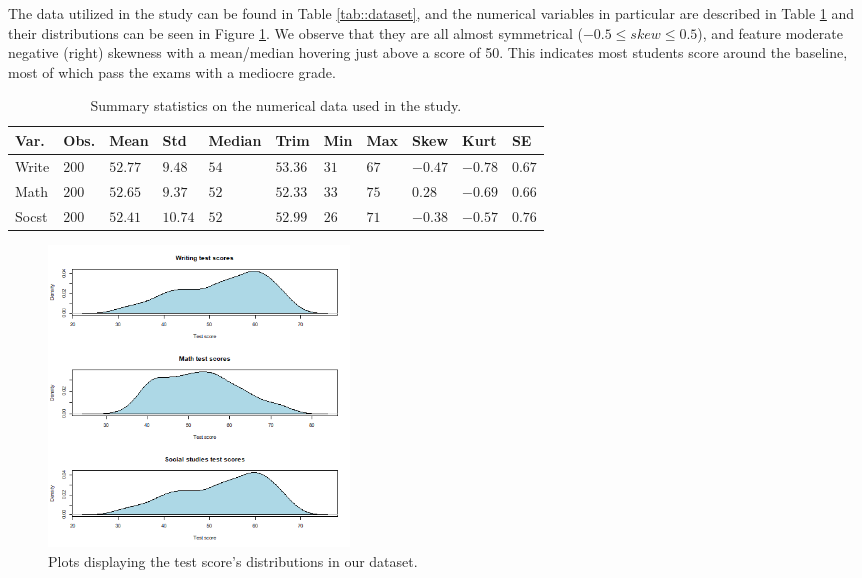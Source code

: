 \documentclass[10pt, a4paper]{article}
\begin{document}
	The data utilized in the study can be found in Table \ref{tab::dataset}, and the numerical variables in particular are described in Table \ref{tab::summary_stats} and their distributions can be seen in Figure \ref{fig::test_distribution}. We observe that they are all almost symmetrical ($-0.5 \leq skew \leq 0.5$), and feature moderate negative (right) skewness with a mean/median hovering just above a score of 50. This indicates most students score around the baseline, most of which pass the exams with a mediocre grade.
	
	\begin{table}
		\centering
		\begin{tabular}
			{ |p{1cm} p{0.5cm} p{0.7cm} p{0.7cm} p{1cm} p{0.7cm} p{0.5cm} p{0.5cm} p{0.5cm} p{0.5cm} p{0.5cm}| }
			\hline
			\textbf{Var.} & \textbf{Obs.} & \textbf{Mean} & \textbf{Std} & \textbf{Median} & \textbf{Trim} & \textbf{Min} & \textbf{Max} & \textbf{Skew} & \textbf{Kurt} & \textbf{SE}\\
			\hline
			Write & $200$ & $52.77$ & $9.48$ & $54$ & $53.36$ & $31$ & $67$ & $-0.47$ & $-0.78$ & $0.67$ \\
			Math & $200$ & $52.65$ & $9.37$ & $52$ & $52.33$ & $33$ & $75$ & $0.28$ & $-0.69$ & $0.66$ \\
			Socst & $200$ & $52.41$ & $10.74$ & $52$ &$ 52.99$ & $26$ & $71$ & $-0.38$ & $-0.57$ & $0.76$ \\
			\hline
		\end{tabular}
		\caption{Summary statistics on the numerical data used in the study.}
		\label{tab::summary_stats}
	\end{table}

	\begin{figure}
		\includegraphics[width=8cm]{density_plots.png}
		\centering
		\caption{Plots displaying the test score's distributions in our dataset.}
		\label{fig::test_distribution}
	\end{figure}
		
\end{document}
